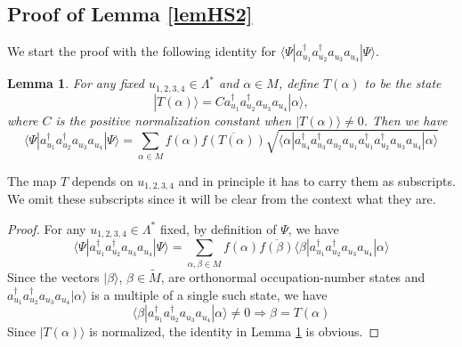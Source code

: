 \documentclass[11pt]{article}
\numberwithin{equation}{section}
\newcommand{\beq}{\begin{equation}}
\newcommand{\eeq}{\end{equation}}
\newcommand{\beqa}{\begin{eqnarray}}
\newcommand{\eeqa}{\end{eqnarray}}
\newcommand\R{{\mathbb R}}
\newcommand\al{{\alpha}}
\newcommand\be{\beta}
\newtheorem{lem}{Lemma}[section]
\theoremstyle{definition}
\begin{document}
\subsection {Proof of Lemma \ref{lemHS2}}



We start the proof with  the following identity for $\langle\Psi|a^\dagger_{u_1}a^\dagger_{u_2}a_{u_3} a_{u_4}|\Psi\rangle$. 
\begin{lem}\label{id4a}
For any fixed $u_{1,2,3,4}\in \Lambda^*$ and $\al\in M$,  define  $T(\al)$ to be the state 
\beq
|T(\al)\rangle=Ca^\dagger_{u_1}a^\dagger_{u_2}a_{u_3} a_{u_4}|\al\rangle, 
\eeq 
where $C$ is the positive normalization constant when  $| T(\al)\rangle\not =0$. Then we have
\beq\label{resultid4a}
\langle\Psi|a^\dagger_{u_1}a^\dagger_{u_2}a_{u_3} a_{u_4}|\Psi\rangle=\sum_{\al\in M}f(\al)\overline {f(T(\al))}
\sqrt{\langle\al|a^\dagger_{u_4}a^\dagger_{u_3}a_{u_2}a_{u_1} a^\dagger_{u_1}a^\dagger_{u_2}a_{u_3} a_{u_4}|\al\rangle}
\eeq
\end{lem}
The map $T$ depends on $u_{1,2,3,4}$ and in principle it has to carry them as subscripts. We omit these subscripts since it will be clear
from the context  what they are. 

\begin{proof} %
For any $u_{1,2,3,4}\in \Lambda^*$ fixed, by definition of $\Psi$, we have
\beq\label{proofid4a1}
\langle\Psi|a^\dagger_{u_1}a^\dagger_{u_2}a_{u_3} a_{u_4}|\Psi\rangle=\sum_{\al,\be\in M}f(\al) {\overline{f(\be)}}\langle\be|a^\dagger_{u_1}a^\dagger_{u_2}a_{u_3} a_{u_4}|\al\rangle
\eeq
Since the vectors $|\be\rangle$, $\be\in\widetilde M$, are orthonormal occupation-number states and $a^\dagger_{u_1}a^\dagger_{u_2}a_{u_3} a_{u_4}|\al\rangle$ is a multiple of a single such state, we have
\beq\label{proofid4a2}
\langle\be|a^\dagger_{u_1}a^\dagger_{u_2}a_{u_3} a_{u_4}|\al\rangle\neq 0\Rightarrow \be=T(\al)
\eeq
Since  $|T(\al)\rangle$ is normalized, the identity in Lemma \ref{id4a} is obvious. 
\end{proof}
\end{document}
